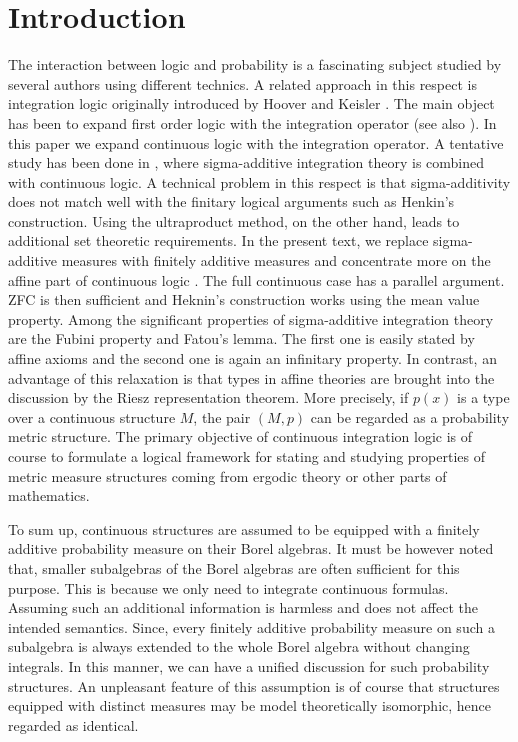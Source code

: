 \documentclass[12pt]{article}
\begin{document}
\section{Introduction}
The interaction between logic and probability is a fascinating subject studied by several authors using different technics.
A related approach in this respect is integration logic originally introduced by Hoover and Keisler \cite{Hoover,Keisler}.
The main object has been to expand first order logic with the integration operator (see also \cite{Bagheri-Pourmahd1}).
In this paper we expand continuous logic with the integration operator.
A tentative study has been done in \cite{Bagheri-Pourmahd2}, where sigma-additive integration theory
is combined with continuous logic. A technical problem in this respect is that sigma-additivity
does not match well with the finitary logical arguments such as Henkin's construction.
Using the ultraproduct method, on the other hand, leads to additional set theoretic requirements.
In the present text, we replace sigma-additive measures with finitely additive measures and concentrate more on the
affine part of continuous logic \cite{ACMT}. The full continuous case has a parallel argument.
ZFC is then sufficient and Heknin's construction works using the mean value property.
Among the significant properties of sigma-additive integration theory are the Fubini property and Fatou's lemma.
The first one is easily stated by affine axioms and the second one is again an infinitary property.
In contrast, an advantage of this relaxation is that types in affine theories are brought into the discussion
by the Riesz representation theorem. More precisely, if $p(x)$ is a type over a continuous structure $M$,
the pair $(M,p)$ can be regarded as a probability metric structure.
The primary objective of continuous integration logic is of course to formulate a logical framework
for stating and studying properties of metric measure structures coming from ergodic theory
or other parts of mathematics.

To sum up, continuous structures are assumed to be equipped with a finitely additive probability measure
on their Borel algebras. It must be however noted that, smaller subalgebras of the Borel algebras
are often sufficient for this purpose. This is because we only need to integrate continuous formulas.
Assuming such an additional information is harmless and does not affect the intended semantics.
Since, every finitely additive probability measure on such a subalgebra is always extended to the
whole Borel algebra without changing integrals.
In this manner, we can have a unified discussion for such probability structures.
An unpleasant feature of this assumption is of course that structures equipped with
distinct measures may be model theoretically isomorphic, hence regarded as identical.
\end{document}
